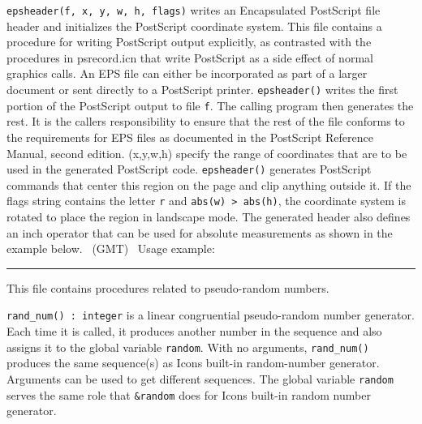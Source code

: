 \texttt{epsheader(f, x, y, w, h, flags)} writes an Encapsulated
PostScript file header and initializes the PostScript coordinate
system. This file contains a procedure for writing PostScript output
explicitly, as contrasted with the procedures in psrecord.icn that
write PostScript as a side effect of normal graphics calls. An EPS file
can either be incorporated as part of a larger document or sent
directly to a PostScript printer. \texttt{epsheader()} writes the first
portion of the PostScript output to file \texttt{f}. The calling
program then generates the rest. It is the caller{\textquotesingle}s
responsibility to ensure that the rest of the file conforms to the
requirements for EPS files as documented in the PostScript Reference
Manual, second edition. (x,y,w,h) specify the range of coordinates that
are to be used in the generated PostScript code. \texttt{epsheader()}
generates PostScript commands that center this region
on the page and clip anything outside it. If the flags string contains
the letter \texttt{{\textquotedbl}r{\textquotedbl}} and \texttt{abs(w)
{\textgreater} abs(h)}, the coordinate system is rotated to place the
region in {\textquotedbl}landscape{\textquotedbl} mode. The generated
header also defines an {\textquotedbl}inch{\textquotedbl} operator that
can be used for absolute measurements as shown in the example below.
\ (GMT) \ Usage example:


\vspace{0.25cm}\hrule{}

This file contains procedures related to pseudo-random numbers.

\texttt{rand\_num() : integer} is a linear congruential pseudo-random
number generator. Each time it is called, it produces
another number in the sequence and also assigns it to the global
variable \texttt{random}. With no arguments, \texttt{rand\_num()}
produces the same sequence(s) as Icon{\textquotesingle}s built-in
random-number generator. Arguments can
be used to get different sequences. The global variable \texttt{random}
serves the same role that \texttt{\&random} does for
Icon{\textquotesingle}s built-in random
number generator.

